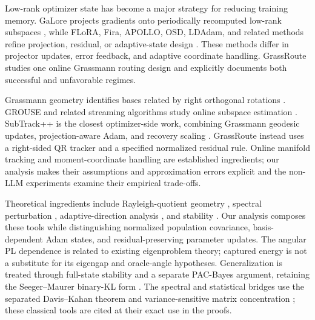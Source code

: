 Low-rank optimizer state has become a major strategy for reducing training memory. GaLore projects gradients onto periodically recomputed low-rank subspaces \cite{zhao2024galore}, while FLoRA, Fira, APOLLO, OSD, LDAdam, and related methods refine projection, residual, or adaptive-state design \cite{hao2024flora,chen2024fira,zhu2024apollo,liang2024osd,robert2024ldadam,he2024golore,su2025galore2,mo2025loro}. These methods differ in projector updates, error feedback, and adaptive coordinate handling. GrassRoute studies one online Grassmann routing design and explicitly documents both successful and unfavorable regimes.

Grassmann geometry identifies bases related by right orthogonal rotations \cite{edelman1998geometry,absil2008optimization,boumal2014manopt}. GROUSE and related streaming algorithms study online subspace estimation \cite{balzano2011grouse,balzano2018streaming}. SubTrack++ is the closest optimizer-side work, combining Grassmann geodesic updates, projection-aware Adam, and recovery scaling \cite{rajabi2025subtrackpp}. GrassRoute instead uses a right-sided QR tracker and a specified normalized residual rule. Online manifold tracking and moment-coordinate handling are established ingredients; our analysis makes their assumptions and approximation errors explicit and the non-LLM experiments examine their empirical trade-offs.

Theoretical ingredients include Rayleigh-quotient geometry \cite{alimisis2024geodesic}, spectral perturbation \cite{yu2015useful}, adaptive-direction analysis \cite{reddi2018adam,chen2019adamtype}, and stability \cite{bousquet2002stability,hardt2016stability}. Our analysis composes these tools while distinguishing normalized population covariance, basis-dependent Adam states, and residual-preserving parameter updates. The angular PL dependence is related to existing eigenproblem theory; captured energy is not a substitute for its eigengap and oracle-angle hypotheses. Generalization is treated through full-state stability and a separate PAC-Bayes argument, retaining the Seeger--Maurer binary-KL form \cite{seeger2002pacbayes,maurer2004note}. The spectral and statistical bridges use the separated Davis--Kahan theorem and variance-sensitive matrix concentration \cite{davis1970rotation,tropp2012user}; these classical tools are cited at their exact use in the proofs.
